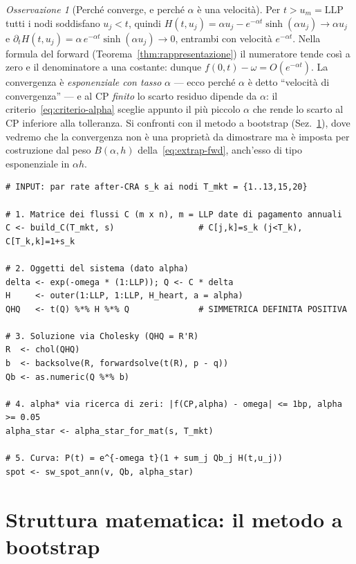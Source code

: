 \documentclass[11pt,a4paper]{article}
\theoremstyle{plain}
\theoremstyle{definition}
\theoremstyle{remark}
\newtheorem*{osservazione}{Osservazione}
\newcommand{\LLP}{\mathrm{LLP}}
\newcommand{\CP}{\mathrm{CP}}
\begin{document}
\begin{osservazione}[Perch\'e converge, e perch\'e $\alpha$ \`e una velocit\`a]
Per $t > u_m = \LLP$ tutti i nodi soddisfano $u_j < t$, quindi
$H(t,u_j) = \alpha u_j - e^{-\alpha t}\sinh(\alpha u_j) \to \alpha u_j$ e
$\partial_t H(t,u_j) = \alpha\, e^{-\alpha t}\sinh(\alpha u_j) \to 0$, entrambi con
velocit\`a $e^{-\alpha t}$. Nella formula del forward
(Teorema~\ref{thm:rappresentazione}) il numeratore tende cos\`i a zero e il denominatore a
una costante: dunque $f(0,t)-\omega = O(e^{-\alpha t})$. La convergenza \`e
\emph{esponenziale con tasso} $\alpha$ --- ecco perch\'e $\alpha$ \`e detto ``velocit\`a di
convergenza'' --- e al $\CP$ \emph{finito} lo scarto residuo dipende da $\alpha$: il
criterio~\eqref{eq:criterio-alpha} sceglie appunto il pi\`u piccolo $\alpha$ che rende lo
scarto al $\CP$ inferiore alla tolleranza. Si confronti con il metodo a bootstrap
(Sez.~\ref{sec:metodo}), dove vedremo che la convergenza non \`e una propriet\`a da
dimostrare ma \`e imposta per costruzione dal peso $B(\alpha,h)$
della~\eqref{eq:extrap-fwd}, anch'esso di tipo esponenziale in $\alpha h$.
\end{osservazione}

\begin{algobox}
\begin{Verbatim}[fontsize=\small]
# INPUT: par rate after-CRA s_k ai nodi T_mkt = {1..13,15,20}

# 1. Matrice dei flussi C (m x n), m = LLP date di pagamento annuali
C <- build_C(T_mkt, s)                 # C[j,k]=s_k (j<T_k), C[T_k,k]=1+s_k

# 2. Oggetti del sistema (dato alpha)
delta <- exp(-omega * (1:LLP)); Q <- C * delta
H     <- outer(1:LLP, 1:LLP, H_heart, a = alpha)
QHQ   <- t(Q) %*% H %*% Q              # SIMMETRICA DEFINITA POSITIVA

# 3. Soluzione via Cholesky (QHQ = R'R)
R  <- chol(QHQ)
b  <- backsolve(R, forwardsolve(t(R), p - q))
Qb <- as.numeric(Q %*% b)

# 4. alpha* via ricerca di zeri: |f(CP,alpha) - omega| <= 1bp, alpha >= 0.05
alpha_star <- alpha_star_for_mat(s, T_mkt)

# 5. Curva: P(t) = e^{-omega t}(1 + sum_j Qb_j H(t,u_j))
spot <- sw_spot_ann(v, Qb, alpha_star)
\end{Verbatim}
\end{algobox}

\section{Struttura matematica: il metodo a bootstrap}
\label{sec:metodo}
\end{document}
